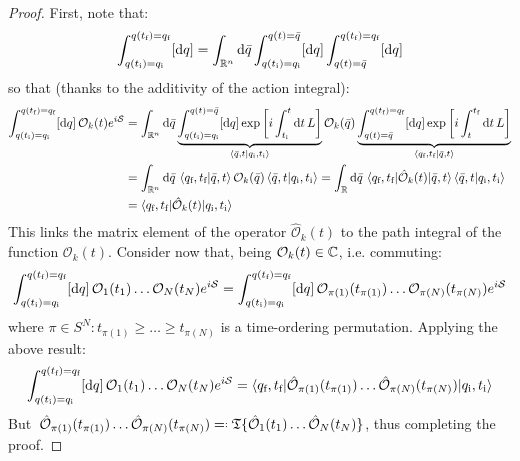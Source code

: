 \begin{proofbox}
  \begin{proof}
    First, note that:
    \begin{equation*}
      \int_{q(t_\text{i}) = q_\text{i}}^{q(t_\text{f}) = q_\text{f}} [\mathrm{d} q] = \int_{\mathbb{R}^n} \mathrm{d}\bar{q} \int_{q(t_\text{i}) = q_\text{i}}^{q(t) = \bar{q}} [\mathrm{d} q] \int_{q(t) = \bar{q}}^{q(t_\text{f}) = q_\text{f}} [\mathrm{d} q]
    \end{equation*}
    so that (thanks to the additivity of the action integral):
    \begin{equation*}
      \begin{split}
        \int_{q(t_\text{i}) = q_\text{i}}^{q(t_\text{f}) = q_\text{f}} [\mathrm{d} q]\, \mathcal{O}_k(t) e^{i \mathcal{S}}
        & = \int_{\mathbb{R}^n} \mathrm{d}\bar{q} \underbrace{\int_{q(t_\text{i}) = q_\text{i}}^{q(t) = \bar{q}} [\mathrm{d} q] \exp \left[ i \int_{t_\text{i}}^t \mathrm{d} t\, L \right]}_{\braket{\bar{q},t | q_\text{i},t_\text{i}}} \mathcal{O}_k(\bar{q}) \underbrace{\int_{q(t) = \bar{q}}^{q(t_\text{f}) = q_\text{f}} [\mathrm{d} q] \exp \left[ i \int_t^{t_\text{f}} \mathrm{d} t\, L \right]}_{\braket{q_\text{f},t_\text{f} | \bar{q},t}} \\
        & = \int_{\mathbb{R}^n} \mathrm{d}\bar{q}\, \braket{q_\text{f},t_\text{f} | \bar{q},t} \mathcal{O}_k(\bar{q}) \braket{\bar{q},t | q_\text{i},t_\text{i}} = \int_{\mathbb{R}} \mathrm{d}\bar{q}\, \braket{q_\text{f},t_\text{f} | \hat{\mathcal{O}}_k(t) | \bar{q},t} \braket{\bar{q},t | q_\text{i},t_\text{i}} \\
        & = \braket{q_\text{f},t_\text{f} | \hat{\mathcal{O}}_k(t) | q_\text{i},t_\text{i}}
      \end{split}
    \end{equation*}
    This links the matrix element of the operator $ \hat{\mathcal{O}}_k(t) $ to the path integral of the function $ \mathcal{O}_k(t) $. Consider now that, being $ \mathcal{O}_k(t) \in \mathbb{C} $, i.e. commuting:
    \begin{equation*}
      \int_{q(t_\text{i}) = q_\text{i}}^{q(t_\text{f}) = q_\text{f}} [\mathrm{d} q]\, \mathcal{O}_1(t_1) \dots \mathcal{O}_N(t_N) e^{i \mathcal{S}} = \int_{q(t_\text{i}) = q_\text{i}}^{q(t_\text{f}) = q_\text{f}} [\mathrm{d} q]\, \mathcal{O}_{\pi(1)}(t_{\pi(1)}) \dots \mathcal{O}_{\pi(N)}(t_{\pi(N)}) e^{i \mathcal{S}}
    \end{equation*}
    where $ \pi \in S^N : t_{\pi(1)} \ge \dots \ge t_{\pi(N)} $ is a time-ordering permutation. Applying the above result:
    \begin{equation*}
      \int_{q(t_\text{i}) = q_\text{i}}^{q(t_\text{f}) = q_\text{f}} [\mathrm{d} q]\, \mathcal{O}_1(t_1) \dots \mathcal{O}_N(t_N) e^{i \mathcal{S}} = \braket{q_\text{f},t_\text{f} | \hat{\mathcal{O}}_{\pi(1)}(t_{\pi(1)}) \dots \hat{\mathcal{O}}_{\pi(N)}(t_{\pi(N)}) | q_\text{i},t_\text{i}}
    \end{equation*}
    But $ \,\hat{\mathcal{O}}_{\pi(1)}(t_{\pi(1)}) \dots \hat{\mathcal{O}}_{\pi(N)}(t_{\pi(N)}) \eqdef \tempord \{\hat{\mathcal{O}}_1(t_1) \dots \hat{\mathcal{O}}_N(t_N)\} $, thus completing the proof.
  \end{proof}
\end{proofbox}

